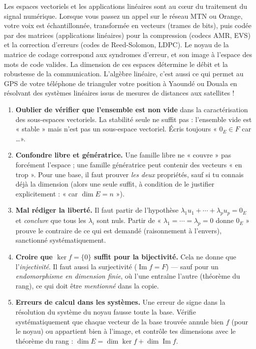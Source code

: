 \documentclass[11pt]{article}
\begin{document}
\begin{savaistu}
Les espaces vectoriels et les applications linéaires sont au cœur du traitement du signal numérique. Lorsque vous passez un appel sur le réseau MTN ou Orange, votre voix est échantillonnée, transformée en vecteurs (trames de bits), puis codée par des matrices (applications linéaires) pour la compression (codecs AMR, EVS) et la correction d'erreurs (codes de Reed-Solomon, LDPC). Le noyau de la matrice de codage correspond aux syndromes d'erreur, et son image à l'espace des mots de code valides. La dimension de ces espaces détermine le débit et la robustesse de la communication. L'algèbre linéaire, c'est aussi ce qui permet au GPS de votre téléphone de trianguler votre position à Yaoundé ou Douala en résolvant des systèmes linéaires issus de mesures de distances aux satellites !
\end{savaistu}

\begin{attention}
\begin{enumerate}
\item \textbf{Oublier de vérifier que l'ensemble est non vide} dans la caractérisation des sous-espaces vectoriels. La stabilité seule ne suffit pas : l'ensemble vide est « stable » mais n'est pas un sous-espace vectoriel. Écris toujours « $0_E\in F$ car \ldots ».
\item \textbf{Confondre libre et génératrice.} Une famille libre ne « couvre » pas forcément l'espace ; une famille génératrice peut contenir des vecteurs « en trop ». Pour une base, il faut prouver \emph{les deux} propriétés, sauf si tu connais déjà la dimension (alors une seule suffit, à condition de le justifier explicitement : « car $\dim E=n$ »).
\item \textbf{Mal rédiger la liberté.} Il faut partir de l'hypothèse $\lambda_1 u_1+\cdots+\lambda_p u_p=0_E$ et \emph{conclure} que tous les $\lambda_i$ sont nuls. Partir de « $\lambda_1=\cdots=\lambda_p=0$ donne $0_E$ » prouve le contraire de ce qui est demandé (raisonnement à l'envers), sanctionné systématiquement.
\item \textbf{Croire que $\ker f=\{0\}$ suffit pour la bijectivité.} Cela ne donne que l'\emph{injectivité}. Il faut aussi la surjectivité ($\operatorname{Im} f=F$) — sauf pour un \emph{endomorphisme en dimension finie}, où l'une entraîne l'autre (théorème du rang), ce qui doit être \emph{mentionné} dans la copie.
\item \textbf{Erreurs de calcul dans les systèmes.} Une erreur de signe dans la résolution du système du noyau fausse toute la base. Vérifie systématiquement que chaque vecteur de la base trouvée annule bien $f$ (pour le noyau) ou appartient bien à l'image, et contrôle tes dimensions avec le théorème du rang : $\dim E=\dim\ker f+\dim\operatorname{Im} f$.
\end{enumerate}
\end{attention}
\end{document}
